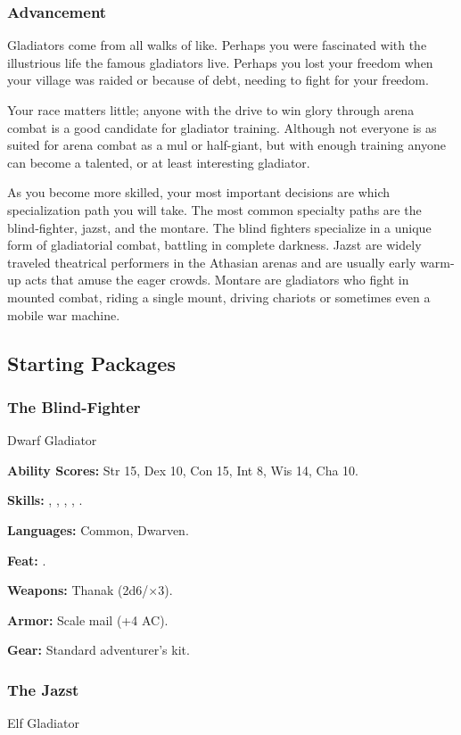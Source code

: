 \subsubsection{Advancement}
Gladiators come from all walks of like. Perhaps you were fascinated with the illustrious life the famous gladiators live. Perhaps you lost your freedom when your village was raided or because of debt, needing to fight for your freedom.

Your race matters little; anyone with the drive to win glory through arena combat is a good candidate for gladiator training. Although not everyone is as suited for arena combat as a mul or half-giant, but with enough training anyone can become a talented, or at least interesting gladiator.

As you become more skilled, your most important decisions are which specialization path you will take. The most common specialty paths are the blind-fighter, jazst, and the montare. The blind fighters specialize in a unique form of gladiatorial combat, battling in complete darkness. Jazst are widely traveled theatrical performers in the Athasian arenas and are usually early warm-up acts that amuse the eager crowds. Montare are gladiators who fight in mounted combat, riding a single mount, driving chariots or sometimes even a mobile war machine.

\subsection{Starting Packages}
\subsubsection{The Blind-Fighter}
Dwarf Gladiator

\textbf{Ability Scores:} Str 15, Dex 10, Con 15, Int 8, Wis 14, Cha 10.

\textbf{Skills:} , , , , .

\textbf{Languages:} Common, Dwarven.

\textbf{Feat:} .

\textbf{Weapons:} Thanak (2d6/$\times$3).

\textbf{Armor:} Scale mail (+4 AC).

\textbf{Gear:} Standard adventurer's kit.

\subsubsection{The Jazst}
Elf Gladiator

